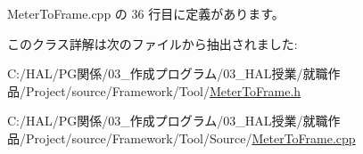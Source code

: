  Meter\+To\+Frame.\+cpp の 36 行目に定義があります。



このクラス詳解は次のファイルから抽出されました\+:\begin{DoxyCompactItemize}
\item 
C\+:/\+H\+A\+L/\+P\+G関係/03\+\_\+作成プログラム/03\+\_\+\+H\+A\+L授業/就職作品/\+Project/source/\+Framework/\+Tool/\mbox{\hyperlink{_meter_to_frame_8h}{Meter\+To\+Frame.\+h}}\item 
C\+:/\+H\+A\+L/\+P\+G関係/03\+\_\+作成プログラム/03\+\_\+\+H\+A\+L授業/就職作品/\+Project/source/\+Framework/\+Tool/\+Source/\mbox{\hyperlink{_meter_to_frame_8cpp}{Meter\+To\+Frame.\+cpp}}\end{DoxyCompactItemize}
